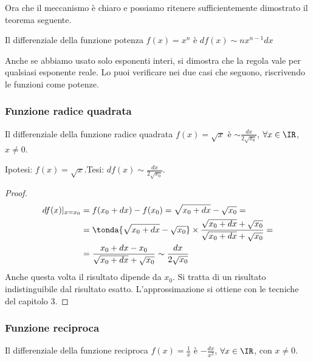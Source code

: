 Ora che il meccanismo è chiaro e possiamo ritenere sufficientemente dimostrato
il teorema seguente.

\begin{teorema}
 Il differenziale della funzione potenza $f(x)=x^n$ è $df(x)\sim nx^{n-1}dx$
\end{teorema}

\begin{osservazione}
Anche se abbiamo usato solo esponenti interi, si dimostra che 
la regola vale per qualsiasi esponente reale. Lo puoi verificare nei due casi 
che seguono, riscrivendo le funzioni come potenze.
\end{osservazione}

\subsubsection{Funzione radice quadrata}
\label{subsubsec:diff01_diffradq}

\begin{teorema}
 Il differenziale della funzione radice quadrata $f(x)=\sqrt{x}$ è
 $\sim\frac{dx}{2\sqrt{x_0}}$, $\forall x\in \IR$, $x\neq 0$.
\end{teorema}

\noindent Ipotesi: \(f(x)=\sqrt{x}\).\tab Tesi: 
\(df(x)\sim\frac{dx}{2\sqrt{x_0}}\).

\begin{proof}
\begin{align*}
 df(x)|_{x=x_0} &= f(x_0+dx)-f(x_0)=\sqrt{x_0+dx}-\sqrt{x_0}=\\
 &=\tonda{\sqrt{x_0+dx}-\sqrt{x_0}}\times\frac{\sqrt{x_0+dx}+
 \sqrt{x_0}}{\sqrt{x_0+dx}+\sqrt{x_0}}=\\
 &=\frac{x_0+dx-x_0}{\sqrt{x_0+dx}+\sqrt{x_0}}\sim\frac{dx}{2\sqrt{x_0}}
\end{align*}
Anche questa volta il risultato dipende da $x_0$. Si tratta di 
un risultato indistinguibile dal risultato esatto. L'approssimazione si 
ottiene
con le tecniche del capitolo 3.
\end{proof}

\subsubsection{Funzione reciproca}
\label{subsubsec:diff01_diffrecip}
\begin{teorema}
 Il differenziale della funzione reciproca $f(x)=\frac{1}{x}$ è 
$-\frac{dx}{x^2}$, 
 $\forall x\in \IR$, con $x\neq 0$.
\end{teorema}

